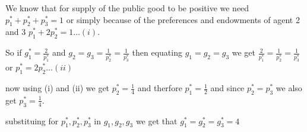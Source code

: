 \documentclass[12pt,a4paper,fleqn]{article}
\begin{document}
We know that for supply of the public good to be positive we need \(p_{1}^* + p_{2}^* +p_{3}^* =1 \) or simply because of the preferences and endowments of agent 2 and 3 \(p_{1}^* + 2p_{2}^*=1 \ldots (i)\).

So if \(g_{1}^*=\frac{2}{p_{1}^*}\) and \(g_{2}=g_{3}=\frac{1}{p_{2}^*}=\frac{1}{p_{3}^*}\) then equating \(g_{1}=g_{2}=g_{3}\) we get \(\frac{2}{p_{1}^*}=\frac{1}{p_{2}^*}=\frac{1}{p_{3}^*}\) or \(p_{1}^*=2p_{2}^* \ldots (ii)\)

now using (i) and (ii) we get \(p_{2}^*=\frac{1}{4}\) and therfore \( p_{1}^*=\frac{1}{2}\) and since \(p_{2}^*=p_{3}^*\) we also get \(p_{3}^*=\frac{1}{4}\).

substituing for \(p_{1}^*, p_{2}^*, p_{3}^* \) in \(g_{1},g_{2},g_{3}\) we get that \(g_{1}^*=g_{2}^*=g_{3}^*=4\)      
\end{document}
